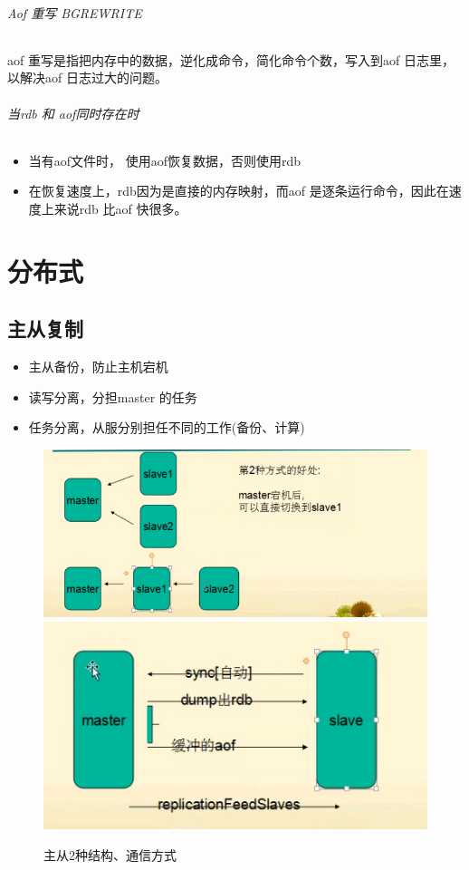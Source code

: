 \documentclass[UTF8,a4paper,12pt]{ctexbook}
\begin{document}
			\subparagraph{Aof 重写 BGREWRITE}
				aof 重写是指把内存中的数据，逆化成命令，简化命令个数，写入到aof 日志里，以解决aof 日志过大的问题。	
			
			\subparagraph{当rdb 和 aof同时存在时}
				\begin{itemize}[itemindent = 1em]
					\item 当有aof文件时， 使用aof恢复数据，否则使用rdb
					\item 在恢复速度上，rdb因为是直接的内存映射，而aof 是逐条运行命令，因此在速度上来说rdb 比aof 快很多。
				\end{itemize}

\chapter{分布式}	
	\section{主从复制}
		\begin{itemize}
			\item 主从备份，防止主机宕机
			\item 读写分离，分担master 的任务
			\item 任务分离，从服分别担任不同的工作(备份、计算)
		\end{itemize}
		
		\begin{figure}[H]
			\centering
			\includegraphics[scale=.7]{slave}
			\includegraphics[scale=1]{slaveCom}
			\caption{主从2种结构、通信方式}
		\end{figure}
		
\end{document}
